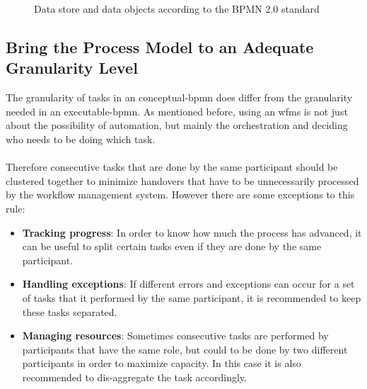 \begin{figure}[H]
\begin{subfigure}[b]{0.18\columnwidth}
		\label{fig:dataobject}
	\end{subfigure}
	\caption{Data store and data objects according to the BPMN 2.0 standard \cite{bpmnstandard}} %
	\label{fig:datastoreandobject} %
\end{figure}

\subsection{Bring the Process Model to an Adequate Granularity Level}\label{granulartity}
The granularity of tasks in an \gls{conceptual-bpmn} does differ from the granularity needed in an \gls{executable-bpmn}.
As mentioned before, using an \gls{wfms} is not just about the possibility of automation, but mainly the orchestration and deciding who needs to be doing which task. \cite{freund2019real}
\\~\\Therefore consecutive tasks that are done by the same participant should be clustered together to minimize handovers that have to be unnecessarily processed by the workflow management system. \cite{fundamentals}
However there are some exceptions to this rule:
\begin{itemize}
	\item \textbf{Tracking progress}: In order to know how much the process has advanced, it can be useful to split certain tasks even if they are done by the same participant. 
	\item \textbf{Handling exceptions}: If different errors and exceptions can occur for a set of tasks that it performed by the same participant, it is recommended to keep these tasks separated.
	\item \textbf{Managing resources}: Sometimes consecutive tasks are performed by participants that have the same role, but could to be done by two different participants in order to maximize capacity. In this case it is also recommended to dis-aggregate the task accordingly.
 \end{itemize}

